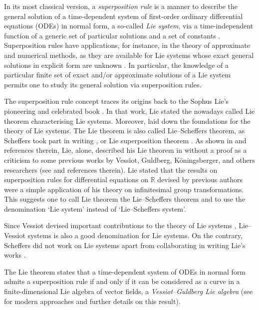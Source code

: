 \documentclass[11pt]{article}
\theoremstyle{plain}
\theoremstyle{definition}
\begin{document}
In its most classical version, a {\it superposition rule} is a manner to describe the general solution of a time-dependent system of first-order ordinary differential equations (ODEs) in normal form, a so-called {\it Lie system}, via a time-independent function of a generic set of particular solutions and a set of constants \cite{BM10,CGM00,CGM07,PW83}. Superposition rules have applications, for instance, in the theory of approximate and numerical methods, as they are available for Lie systems whose exact general solutions in explicit form are unknown \cite{Pi12,PW83}. In particular, the knowledge of a particular finite set of exact and/or approximate solutions of a Lie system permits one to study its general solution via superposition rules.

The superposition rule concept traces its origins back to the Sophus Lie's pioneering and celebrated book \cite{Lie1893}. In that work, Lie stated the nowadays called Lie theorem characterising Lie systems. Moreover, \cite{Lie1893} laid down the foundations for the theory of Lie systems. The Lie theorem is also called Lie--Scheffers theorem, as Scheffers took part in writing \cite{Lie1893}, or Lie superposition theorem \cite{BM10local-global}. As  shown in \cite{LS21} and references therein, Lie, alone, described his Lie theorem in \cite{Li93a} without a proof as a criticism to some previous works by Vessiot, Guldberg, K\"oningsberger, and others researchers (see \cite{Gu93,LS21,Ve93} and references therein). Lie stated that the results on superposition rules for differential equations on $\mathbb{R}$ devised by previous authors were a simple application of his theory on infinitesimal group transformations. This suggests one to call Lie theorem the Lie--Scheffers theorem and  to use the denomination `Lie system' instead of  `Lie--Scheffers system'. 

Since Vessiot devised important contributions to the theory of Lie systems \cite{Dissertationes,LS21},  Lie--Vessiot systems is also a good denomination for Lie systems. On the contrary, Scheffers did not work on Lie systems apart from collaborating in writing Lie's works \cite{LS21}. 

The Lie theorem states that a time-dependent system of ODEs in normal form admits a superposition rule if and only if it can be considered as a curve in a finite-dimensional Lie algebra of vector fields, a {\it Vessiot--Guldberg Lie algebra} (see \cite{BM10local-global,CGM00,CGM07} for modern approaches  and further details on this result). 
\end{document}
